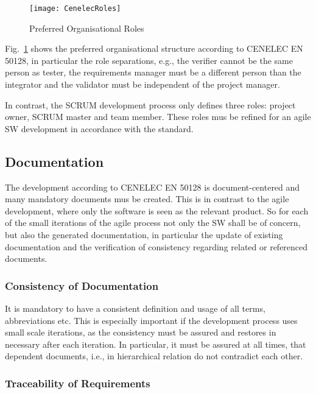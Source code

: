 \begin{figure}[ht]
  \centering
  \texttt{[image: CenelecRoles]}
  \caption{Preferred Organisational Roles}
  \label{fig:preferred-roles}
\end{figure}

Fig.~\ref{fig:preferred-roles} shows the preferred organisational structure
according to CENELEC EN 50128, in particular  the role separations,
e.g., the verifier cannot be the same person as tester, the requirements
manager must be a different person than the integrator and the validator must be
independent of the project manager.

In contrast, the SCRUM development process only defines three roles: project
owner, SCRUM master and team member. These roles mus be refined for an agile SW
development in accordance with the standard.

\subsection{Documentation}
\label{sec:documentation}

The development according to CENELEC EN 50128 is document-centered and many
mandatory documents mus be created. This is in contrast to the agile
development, where only the software is seen as the relevant product. So for
each of the small iterations of the agile process not only the SW shall be of
concern, but also the generated documentation, in particular the update of
existing documentation and the verification of consistency regarding related or
referenced documents.

\subsubsection{Consistency of Documentation}
\label{sec:cons-docum}

It is mandatory to have a consistent definition and usage of all terms,
abbreviations etc. This is especially important if the development process uses
small scale iterations, as the consistency must be assured and restores in
necessary after each iteration. In particular, it must be assured at all times,
that dependent documents, i.e., in hierarchical relation do not contradict each
other.

\subsubsection{Traceability of Requirements}
\label{sec:trac-requ}


